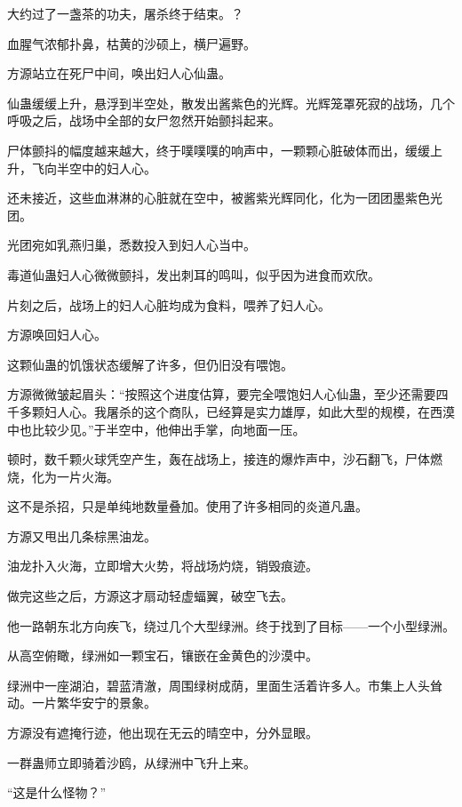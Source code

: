 
\begin{this_body}

大约过了一盏茶的功夫，屠杀终于结束。？

血腥气浓郁扑鼻，枯黄的沙硕上，横尸遍野。

方源站立在死尸中间，唤出妇人心仙蛊。

仙蛊缓缓上升，悬浮到半空处，散发出酱紫色的光辉。光辉笼罩死寂的战场，几个呼吸之后，战场中全部的女尸忽然开始颤抖起来。

尸体颤抖的幅度越来越大，终于噗噗噗的响声中，一颗颗心脏破体而出，缓缓上升，飞向半空中的妇人心。

还未接近，这些血淋淋的心脏就在空中，被酱紫光辉同化，化为一团团墨紫色光团。

光团宛如乳燕归巢，悉数投入到妇人心当中。

毒道仙蛊妇人心微微颤抖，发出刺耳的鸣叫，似乎因为进食而欢欣。

片刻之后，战场上的妇人心脏均成为食料，喂养了妇人心。

方源唤回妇人心。

这颗仙蛊的饥饿状态缓解了许多，但仍旧没有喂饱。

方源微微皱起眉头：“按照这个进度估算，要完全喂饱妇人心仙蛊，至少还需要四千多颗妇人心。我屠杀的这个商队，已经算是实力雄厚，如此大型的规模，在西漠中也比较少见。”于半空中，他伸出手掌，向地面一压。

顿时，数千颗火球凭空产生，轰在战场上，接连的爆炸声中，沙石翻飞，尸体燃烧，化为一片火海。

这不是杀招，只是单纯地数量叠加。使用了许多相同的炎道凡蛊。

方源又甩出几条棕黑油龙。

油龙扑入火海，立即增大火势，将战场灼烧，销毁痕迹。

做完这些之后，方源这才扇动轻虚蝠翼，破空飞去。

他一路朝东北方向疾飞，绕过几个大型绿洲。终于找到了目标——一个小型绿洲。

从高空俯瞰，绿洲如一颗宝石，镶嵌在金黄色的沙漠中。

绿洲中一座湖泊，碧蓝清澈，周围绿树成荫，里面生活着许多人。市集上人头耸动。一片繁华安宁的景象。

方源没有遮掩行迹，他出现在无云的晴空中，分外显眼。

一群蛊师立即骑着沙鸥，从绿洲中飞升上来。

“这是什么怪物？”


\end{this_body}
